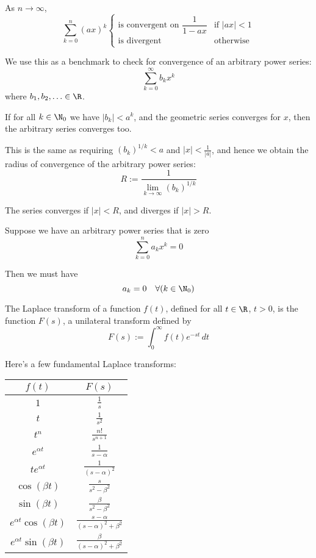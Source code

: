 As $n\to\infty$,
$$
  \sum_{k=0}^n(ax)^k\begin{cases}
    \text{is convergent on }\dfrac1{1-ax} & \text{if }|ax|<1 \\
    \text{is divergent}                   & \text{otherwise}
  \end{cases}
$$

We use this as a benchmark to check for convergence of an arbitrary power
series:
$$
  \sum_{k=0}^\infty b_kx^k
$$
where $b_1,b_2,\ldots\in\R$.

If for all $k\in\N_0$ we have $|b_k|<a^k$, and the geometric series converges
for $x$, then the arbitrary series converges too.

This is the same as requiring $(b_k)^{1/k}<a$ and $|x|<\frac1{|a|}$, and hence
we obtain the radius of convergence of the arbitrary power series:
$$
  R:=\frac{1}{\displaystyle\lim_{k\to\infty}(b_k)^{1/k}}
$$

The series converges if $|x|<R$, and diverges if $|x|>R$.

\label{fe2e0f1}

Suppose we have an arbitrary power series that is zero
$$
  \sum_{k=0}^na_kx^k = 0
$$

Then we must have
$$
  a_k=0\quad\forall(k\in\N_0)
$$

\label{a7047c9}

The Laplace transform of a function $f(t)$, defined for all $t\in\R$, $t>0$, is
the function $F(s)$, a unilateral transform defined by
$$
  F(s):=\int_0^\infty f(t)e^{-st}\,dt
$$

Here's a few fundamental Laplace transforms:
\begin{center}
  \def\L#1{\mathcal L\{{#1}\}(s)}
  \def\a{\alpha}\def\b{\beta}
  \renewcommand{\arraystretch}{1.5}
  \begin{tabular}{|c|c|}
    \hline
    $f(t)$                   & $F(s)$                       \\\hline
    $1$                      & $\frac1s$                    \\\hline
    $t$                      & $\frac1{s^2}$                \\\hline
    $t^n$                    & $\frac{n!}{s^{n+1}}$         \\\hline
    $e^{\a t}$               & $\frac1{s-\a}$               \\\hline
    $te^{\a t}$              & $\frac1{(s-\a)^2}$           \\\hline
    $\cos(\b t)$             & $\frac{s}{s^2-\b^2}$         \\\hline
    $\sin(\b t)$             & $\frac{\b}{s^2-\b^2}$        \\\hline
    $e^{\alpha t}\cos(\b t)$ & $\frac{s-\a}{(s-\a)^2+\b^2}$ \\\hline
    $e^{\alpha t}\sin(\b t)$ & $\frac{\b}{(s-\a)^2+\b^2}$   \\\hline
  \end{tabular}
\end{center}

